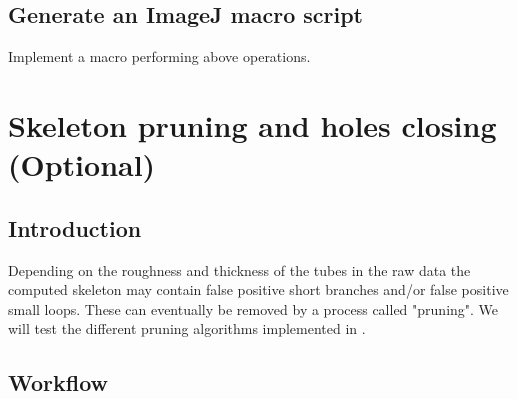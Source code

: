 \subsection{Generate an ImageJ macro script}
%
Implement a macro performing above operations.
%



\section{Skeleton pruning and holes closing (Optional)}
%
\subsection{Introduction}
Depending on the roughness and thickness of the tubes in the raw data the computed skeleton may contain false positive short branches and/or false positive small loops. These can eventually be removed by a process called "pruning". We will test the different pruning algorithms implemented in .
\subsection{Workflow}

